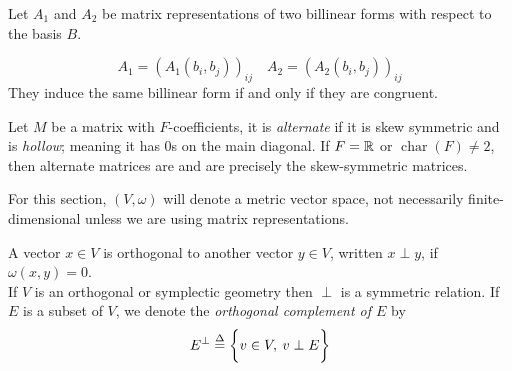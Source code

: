 \documentclass[../main-manifolds.tex]{subfiles}
\begin{document}
    \begin{wts}
        Let $A_1$ and $A_2$ be matrix representations of two billinear forms with respect to the basis $B$.
        
        \[
            A_1 = (A_1(b_i,b_j))_{ij}\quad A_2 = (A_2(b_i,b_j))_{ij}
        \]
        They induce the same billinear form if and only if they are congruent. 
    \end{wts}

    \begin{definition}
        Let $M$ be a matrix with $F$-coefficients, it is \emph{alternate} if it is skew symmetric and is \emph{hollow}; meaning it has $0$s on the main diagonal. If $F=\mathbb{R}$ or $\operatorname{char}(F)\neq 2$, then alternate matrices are and are precisely the skew-symmetric matrices.
    \end{definition}

    For this section, $(V,\omega)$ will denote a metric vector space, not necessarily finite-dimensional unless we are using matrix representations.
    
    \begin{definition}
        A vector $x\in V$ is orthogonal to another vector $y\in V$, written $x\perp y$, if $\omega(x,y)=0$. \\

        If $V$ is an orthogonal or symplectic geometry then $\perp$ is a symmetric relation. If $E$ is a subset of $V$, we denote the \emph{orthogonal complement of $E$} by 
        \[
            E^\perp \overset{\Delta}{=} \biggl\{{v\in V,\: v\perp E}\biggr\}
        \]
    \end{definition}
\end{document}

